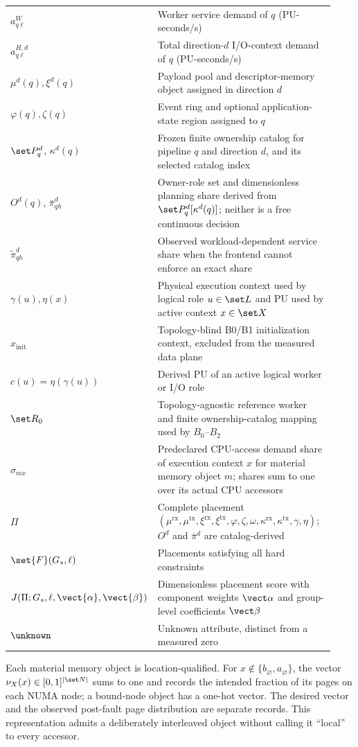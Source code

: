 \begin{longtable}{@{}p{0.20\linewidth}p{0.73\linewidth}@{}}
$a^{W}_{q\ell}$ & Worker service demand of $q$ (PU-seconds/s) \\
$a^{H,d}_{q\ell}$ & Total direction-$d$ I/O-context demand of $q$ (PU-seconds/s) \\
$\mu^d(q),\xi^d(q)$ & Payload pool and descriptor-memory object assigned in direction $d$ \\
$\varphi(q),\zeta(q)$ & Event ring and optional application-state region assigned to $q$ \\
$\set P_q^d$, $\kappa^d(q)$ & Frozen finite ownership catalog for pipeline $q$ and direction $d$, and its selected catalog index \\
$O^d(q)$, $\bar\pi^d_{qh}$ & Owner-role set and dimensionless planning share derived from $\set P_q^d[\kappa^d(q)]$; neither is a free continuous decision \\
$\widetilde\pi^d_{qh}$ & Observed workload-dependent service share when the frontend cannot enforce an exact share \\
$\gamma(u),\eta(x)$ & Physical execution context used by logical role $u\in\set L$ and PU used by active context $x\in\set X$ \\
$x_{\mathrm{init}}$ & Topology-blind B0/B1 initialization context, excluded from the measured data plane \\
$c(u)=\eta(\gamma(u))$ & Derived PU of an active logical worker or I/O role \\
$\set R_0$ & Topology-agnostic reference worker and finite ownership-catalog mapping used by $B_0$--$B_2$ \\
$\sigma_{mx}$ & Predeclared CPU-access demand share of execution context $x$ for material memory object $m$; shares sum to one over its actual CPU accessors \\
$\Pi$ & Complete placement $(\mu^{\mathrm{rx}},\mu^{\mathrm{tx}},\xi^{\mathrm{rx}},\xi^{\mathrm{tx}},\varphi,\zeta,\omega,\kappa^{\mathrm{rx}},\kappa^{\mathrm{tx}},\gamma,\eta)$; $O^d$ and $\bar\pi^d$ are catalog-derived \\
$\set{F}(G_s,\ell)$ & Placements satisfying all hard constraints \\
$J(\Pi;G_s,\ell,\vect{\alpha},\vect{\beta})$ & Dimensionless placement score with component weights $\vect\alpha$ and group-level coefficients $\vect\beta$ \\
$\unknown$ & Unknown attribute, distinct from a measured zero \\
\bottomrule
\end{longtable}

Each material memory object is location-qualified. For $x\notin\{b_\varnothing,a_\varnothing\}$, the vector $\nu_X(x)\in[0,1]^{|\set N|}$ sums to one and records the intended fraction of its pages on each NUMA node; a bound-node object has a one-hot vector. The desired vector and the observed post-fault page distribution are separate records. This representation admits a deliberately interleaved object without calling it ``local'' to every accessor.

